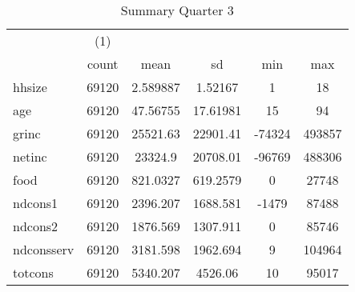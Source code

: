 \begin{table}[htbp]\centering
\def\sym#1{\ifmmode^{#1}\else\(^{#1}\)\fi}
\caption{Summary Quarter 3 \label{sum\_Q3}}
\begin{tabular}{l*{1}{ccccc}}
\hline\hline
            &\multicolumn{1}{c}{(1)}&            &            &            &            \\
            &       count&        mean&          sd&         min&         max\\
\hline
hhsize      &       69120&    2.589887&     1.52167&           1&          18\\
age         &       69120&    47.56755&    17.61981&          15&          94\\
grinc       &       69120&    25521.63&    22901.41&      -74324&      493857\\
netinc      &       69120&     23324.9&    20708.01&      -96769&      488306\\
food        &       69120&    821.0327&    619.2579&           0&       27748\\
ndcons1     &       69120&    2396.207&    1688.581&       -1479&       87488\\
ndcons2     &       69120&    1876.569&    1307.911&           0&       85746\\
ndconsserv  &       69120&    3181.598&    1962.694&           9&      104964\\
totcons     &       69120&    5340.207&     4526.06&          10&       95017\\
\hline\hline
\end{tabular}
\end{table}
